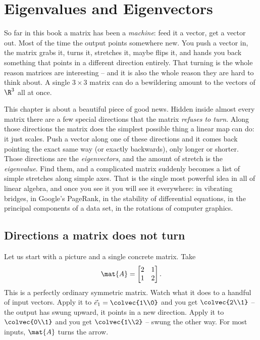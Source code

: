 \chapter{Eigenvalues and Eigenvectors}

So far in this book a matrix has been a \emph{machine}: feed it a vector, get a
vector out. Most of the time the output points somewhere new. You push a vector
in, the matrix grabs it, turns it, stretches it, maybe flips it, and hands you
back something that points in a different direction entirely. That turning is the
whole reason matrices are interesting -- and it is also the whole reason they are
hard to think about. A single $3\times 3$ matrix can do a bewildering amount to
the vectors of $\R^3$ all at once.

This chapter is about a beautiful piece of good news. Hidden inside almost every
matrix there are a few special directions that the matrix \emph{refuses to turn}.
Along those directions the matrix does the simplest possible thing a linear map
can do: it just scales. Push a vector along one of these directions and it comes
back pointing the exact same way (or exactly backwards), only longer or shorter.
Those directions are the \emph{eigenvectors}, and the amount of stretch is the
\emph{eigenvalue}. Find them, and a complicated matrix suddenly becomes a list of
simple stretches along simple axes. That is the single most powerful idea in all
of linear algebra, and once you see it you will see it everywhere: in vibrating
bridges, in Google's PageRank, in the stability of differential equations, in the
principal components of a data set, in the rotations of computer graphics.

\section{Directions a matrix does not turn}
\label{ch23:directions}

Let us start with a picture and a single concrete matrix. Take
\[
  \mat{A}=\begin{bmatrix} 2 & 1 \\ 1 & 2 \end{bmatrix}.
\]
This is a perfectly ordinary symmetric matrix. Watch what it does to a handful of
input vectors. Apply it to $\vec{e}_1 = \colvec{1\\0}$ and you get $\colvec{2\\1}$
-- the output has swung upward, it points in a new direction. Apply it to
$\colvec{0\\1}$ and you get $\colvec{1\\2}$ -- swung the other way. For most
inputs, $\mat{A}$ turns the arrow.

